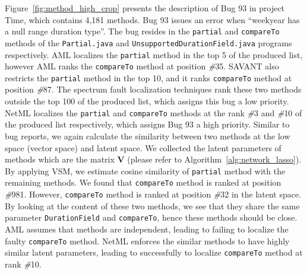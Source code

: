 Figure~\ref{fig:method_high_crop} presents the description of Bug 93 in project Time, which contains 4,181 methods. Bug 93 issues an error when ``weekyear has a null range duration type''. The bug resides in the \texttt{partial} and \texttt{compareTo} methods of the \texttt{Partial.java} and \texttt{UnsupportedDurationField.java} programs respectively. AML localizes the \texttt{partial} method in the top 5 of the produced list, however AML ranks the \texttt{compareTo} method at position \textit{\#}35. SAVANT also restricts the \texttt{partial} method in the top 10, and it ranks \texttt{compareTo} method at position \textit{\#}87. The spectrum fault localization techniques rank these two methods outside the top 100 of the produced list, which assigns this bug a low priority. NetML localizes the \texttt{partial} and \texttt{compareTo} methods at the rank \textit{\#}3 and \textit{\#}10 of the produced list respectively, which assigns Bug 93 a high priority. Similar to bug reports, we again calculate the similarity between two methods at the low space (vector space) and latent space. We collected the latent parameters of methods which are the matrix $\mathbf{V}$ (please refer to Algorithm~\ref{alg:network_lasso}). By applying VSM, we estimate cosine similarity of \texttt{partial} method with the remaining methods. We found that \texttt{compareTo} method is ranked at position \textit{\#}981. However, \texttt{compareTo} method is ranked at position \textit{\#}32 in the latent space. By looking at the content of these two methods, we see that they share the same parameter \texttt{DurationField} and \texttt{compareTo}, hence these methods should be close. AML assumes that methods are independent, leading to failing to localize the faulty \texttt{compareTo} method. NetML enforces the similar methods to have highly similar latent parameters, leading to successfully to localize \texttt{compareTo} method at rank \textit{\#}10. 

